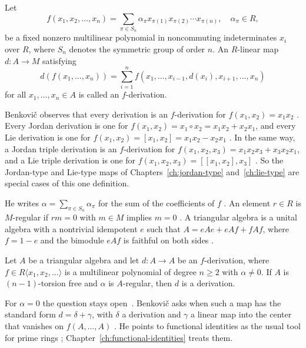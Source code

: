 \begin{definition}\label{def:f:polynomial}
Let
\[ f(x_1,x_2,\dots,x_n)=\sum_{\pi\in S_n}\alpha_\pi x_{\pi(1)}x_{\pi(2)}\cdots x_{\pi(n)},
\quad \alpha_\pi\in R, \tag{1.1} \]
be a fixed nonzero multilinear polynomial in noncommuting indeterminates $x_i$ over
$R$, where $S_n$ denotes the symmetric group of order $n$. An $R$-linear map
$d:A\to M$ satisfying
\[ d(f(x_1,\dots,x_n))=\sum_{i=1}^{n}f(x_1,\dots,x_{i-1},d(x_i),x_{i+1},\dots,x_n) \tag{1.2} \]
for all $x_1,\dots,x_n\in A$ is called an $f$-derivation.
\end{definition}

Benkovič observes that every derivation is an $f$-derivation for
$f(x_1,x_2)=x_1x_2$ \cite[Section~1]{Benkovic2014}. Every Jordan derivation is
one for $f(x_1,x_2)=x_1\circ x_2=x_1x_2+x_2x_1$, and every Lie derivation is
one for $f(x_1,x_2)=[x_1,x_2]=x_1x_2-x_2x_1$ \cite[Section~1]{Benkovic2014}.
In the same way, a Jordan triple derivation is an $f$-derivation for
$f(x_1,x_2,x_3)=x_1x_2x_3+x_3x_2x_1$, and a Lie triple derivation is one for
$f(x_1,x_2,x_3)=[[x_1,x_2],x_3]$ \cite[Section~1]{Benkovic2014}. So the
Jordan-type and Lie-type maps of Chapters~\ref{ch:jordan-type}
and~\ref{ch:lie-type} are special cases of this one definition.

He writes $\alpha=\sum_{\pi\in S_n}\alpha_\pi$ for the sum of the coefficients
of $f$ \cite[Section~1]{Benkovic2014}. An element $r\in R$ is $M$-regular if
$rm=0$ with $m\in M$ implies $m=0$ \cite[Section~1]{Benkovic2014}. A
triangular algebra is a unital algebra with a nontrivial idempotent $e$ such
that $A=eAe+eAf+fAf$, where $f=1-e$ and the bimodule $eAf$ is faithful on both
sides \cite[Section~1]{Benkovic2014}.

\begin{theorem}\label{thm:f:triangular}
Let $A$ be a triangular algebra and let $d:A\to A$ be an $f$-derivation, where
$f\in R\langle x_1,x_2,\dots\rangle$ is a multilinear polynomial of degree $n\ge2$
with $\alpha\ne0$. If $A$ is $(n-1)$-torsion free and $\alpha$ is $A$-regular, then $d$
is a derivation.
\end{theorem}

For $\alpha=0$ the question stays open~\cite[Section~1]{Benkovic2014}. Benkovič asks when such a map has the
standard form $d=\delta+\gamma$, with $\delta$ a derivation and $\gamma$ a
linear map into the center that vanishes on $f(A,\dots,A)$
\cite[Problem~1.2]{Benkovic2014}. He points to functional identities as the
usual tool for prime rings \cite[Section~1]{Benkovic2014};
Chapter~\ref{ch:functional-identities} treats them.

